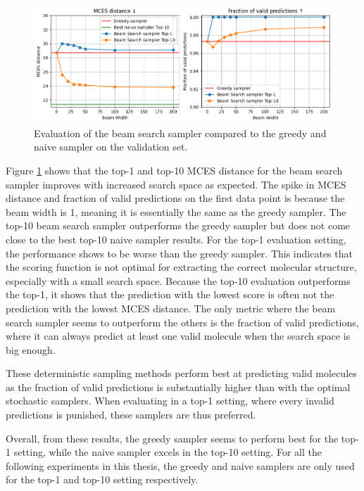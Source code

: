 \begin{figure}[h]
    \centering
    \includegraphics[width=1.0\textwidth]{figures/results/samplers/beam_search.png}
    \caption{Evaluation of the beam search sampler compared to the greedy and naive sampler on the validation set.}
    \label{fig:beam-search}
\end{figure}

Figure \ref{fig:beam-search} shows that the top-1 and top-10 MCES distance for the beam search sampler improves with increased search space as expected.
The spike in MCES distance and fraction of valid predictions on the first data point is because the beam width is 1, meaning it is essentially the same as the greedy sampler.
The top-10 beam search sampler outperforms the greedy sampler but does not come close to the best top-10 naive sampler results. 
For the top-1 evaluation setting, the performance shows to be worse than the greedy sampler.
This indicates that the scoring function is not optimal for extracting the correct molecular structure, especially with a small search space.
Because the top-10 evaluation outperforms the top-1, it shows that the prediction with the lowest score is often not the prediction with the lowest MCES distance.
The only metric where the beam search sampler seems to outperform the others is the fraction of valid predictions, where it can always predict at least one valid molecule when the search space is big enough.

These deterministic sampling methods perform best at predicting valid molecules as the fraction of valid predictions is substantially higher than with the optimal stochastic samplers.
When evaluating in a top-1 setting, where every invalid predictions is punished, these samplers are thus preferred.

Overall, from these results, the greedy sampler seems to perform best for the top-1 setting, while the naive sampler excels in the top-10 setting.
For all the following experiments in this thesis, the greedy and naive samplers are only used for the top-1 and top-10 setting respectively.

